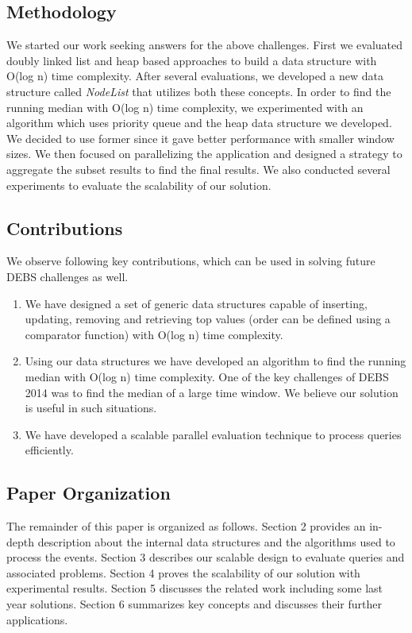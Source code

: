 \subsection{Methodology}

We started our work seeking answers for the above challenges. First we evaluated doubly linked list and heap based approaches to build a data structure with O(log n) time complexity. After several evaluations, we developed a new data structure called \textit{NodeList} that utilizes both these concepts. In order to find the running median with O(log n) time complexity, we experimented with an algorithm which uses priority queue and the heap data structure we developed. We decided to use former since it gave better performance with smaller window sizes. We then focused on parallelizing the application and designed a strategy to aggregate the subset results to find the final results. We also conducted several experiments to evaluate the scalability of our solution. 


\subsection{Contributions}
We observe following key contributions, which can be used in solving future DEBS challenges as well.
\begin{enumerate}
	\item We have designed a set of  generic data structures capable of inserting, updating, removing and retrieving top values (order can be defined using a comparator function) with O(log n) time complexity. 
	\item Using our data structures we have developed an algorithm to find the running median with O(log n) time complexity. One of the key challenges of DEBS 2014 \cite{jerzak2014debs}  was to find the median of a large time window. We believe our solution is useful in such situations.
	\item We have developed a scalable parallel evaluation technique to process queries efficiently. 
\end{enumerate}

\subsection{Paper Organization}
The remainder of this paper is organized as follows. Section 2 provides an in-depth description about the internal data structures and the algorithms used to process the events. Section 3 describes our scalable design to evaluate queries and associated problems. Section 4 proves the scalability of our solution with experimental results. Section 5 discusses the related work including some last year solutions. Section 6 summarizes key concepts and discusses their further applications. 
